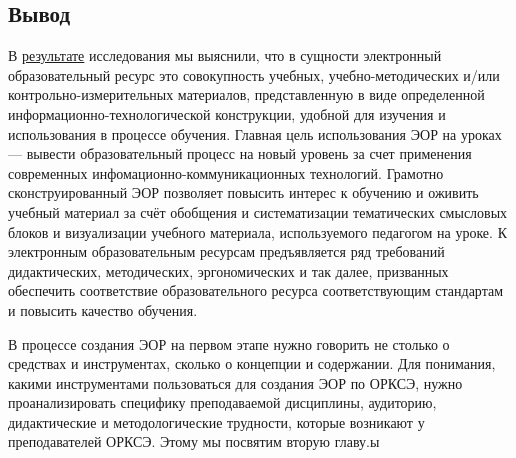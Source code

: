 \newpage
\subsection{Вывод}
В \hyperref[task1]{результате} исследования мы выяснили, что в сущности электронный образовательный ресурс это совокупность учебных, учебно-методических и/или контрольно-измерительных материалов, представленную в виде определенной информационно-технологической конструкции, удобной для изучения и
использования в процессе обучения\cite{jurkina20}. Главная цель использования ЭОР на уроках --- вывести образовательный процесс на новый уровень за счет применения современных инфомационно-коммуникационных технологий. Грамотно сконструированный ЭОР позволяет повысить интерес к обучению и оживить учебный материал за счёт обобщения и систематизации тематических смысловых блоков и визуализации учебного материала, используемого педагогом на уроке.
К электронным образовательным ресурсам предъявляется ряд требований дидактических, методических, эргономических и так далее, призванных обеспечить соответствие образовательного ресурса соответствующим стандартам и повысить качество обучения.

В процессе создания ЭОР на первом этапе нужно говорить не столько о средствах и инструментах, сколько о концепции и содержании. Для понимания, какими инструментами пользоваться для создания ЭОР по ОРКСЭ, нужно проанализировать специфику преподаваемой дисциплины, аудиторию, дидактические и методологические трудности, которые возникают у преподавателей ОРКСЭ. Этому мы посвятим вторую главу.ы

\listoftodos